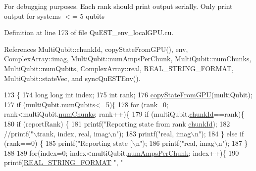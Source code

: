 For debugging purposes. Each rank should print output serially. Only print output for systems $<$= 5 qubits 

Definition at line 173 of file Qu\+E\+S\+T\+\_\+env\+\_\+local\+G\+P\+U.\+cu.



References Multi\+Qubit\+::chunk\+Id, copy\+State\+From\+G\+P\+U(), env, Complex\+Array\+::imag, Multi\+Qubit\+::num\+Amps\+Per\+Chunk, Multi\+Qubit\+::num\+Chunks, Multi\+Qubit\+::num\+Qubits, Complex\+Array\+::real, R\+E\+A\+L\+\_\+\+S\+T\+R\+I\+N\+G\+\_\+\+F\+O\+R\+M\+AT, Multi\+Qubit\+::state\+Vec, and sync\+Qu\+E\+S\+T\+Env().


\begin{DoxyCode}
173                                                                              \{
174     \textcolor{keywordtype}{long} \textcolor{keywordtype}{long} \textcolor{keywordtype}{int} index;
175     \textcolor{keywordtype}{int} rank;
176     \mbox{\hyperlink{QuEST__env__localGPU_8cu_a0d255fec1e375244d4cb980fac92621d}{copyStateFromGPU}}(multiQubit); 
177     \textcolor{keywordflow}{if} (multiQubit.\mbox{\hyperlink{structMultiQubit_ab5b9795bdc6fb5855e1974dcbbaeb36f}{numQubits}}<=5)\{
178         \textcolor{keywordflow}{for} (rank=0; rank<multiQubit.\mbox{\hyperlink{structMultiQubit_acd43f2f57991709c9e94f73662c972b2}{numChunks}}; rank++)\{
179             \textcolor{keywordflow}{if} (multiQubit.\mbox{\hyperlink{structMultiQubit_ab10c88249fa3825d6227ceec01d37e37}{chunkId}}==rank)\{
180                 \textcolor{keywordflow}{if} (reportRank) \{
181                     printf(\textcolor{stringliteral}{"Reporting state from rank %
      \mbox{\hyperlink{structMultiQubit_ab10c88249fa3825d6227ceec01d37e37}{chunkId}});
182                     \textcolor{comment}{//printf("\(\backslash\)trank, index, real, imag\(\backslash\)n");}
183                     printf(\textcolor{stringliteral}{"real, imag\(\backslash\)n"});
184                 \} \textcolor{keywordflow}{else} \textcolor{keywordflow}{if} (rank==0) \{
185                     printf(\textcolor{stringliteral}{"Reporting state [\(\backslash\)n"});
186                     printf(\textcolor{stringliteral}{"real, imag\(\backslash\)n"});
187                 \}
188 
189                 \textcolor{keywordflow}{for}(index=0; index<multiQubit.\mbox{\hyperlink{structMultiQubit_a1cad83601a78635dd278259c7ed54f18}{numAmpsPerChunk}}; index++)\{
190                     printf(\mbox{\hyperlink{QuEST__precision_8h_ad751ac7ddc8ec19f23fb33083c0da8da}{REAL\_STRING\_FORMAT}} \textcolor{stringliteral}{", "} 
}
\end{DoxyCode}

